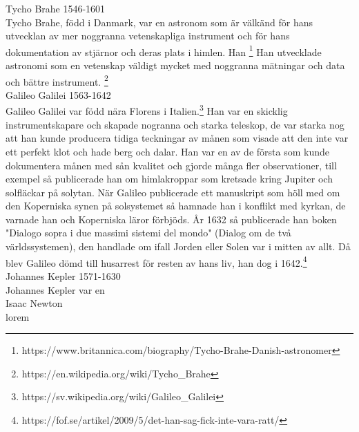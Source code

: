 \documentclass[11p]{article}
\begin{document}
    \large Tycho Brahe 1546-1601\\
    \normalsize Tycho Brahe, född i Danmark, var en astronom som är välkänd för hans utvecklan av mer noggranna
    vetenskapliga instrument och för hans dokumentation av stjärnor och deras plats i himlen. Han  \footnote{https://www.britannica.com/biography/Tycho-Brahe-Danish-astronomer}
    Han utvecklade astronomi som en vetenskap väldigt
    mycket med noggranna mätningar och data och bättre instrument. \footnote{https://en.wikipedia.org/wiki/Tycho_Brahe}
    \\


    \large Galileo Galilei 1563-1642\\
    \normalsize Galileo Galilei var född nära Florens i Italien.\footnote{https://sv.wikipedia.org/wiki/Galileo_Galilei} Han var en skicklig instrumentskapare och skapade
    nogranna och starka teleskop, de var starka nog att han kunde producera tidiga teckningar av månen som
    visade att den inte var ett perfekt klot och hade berg och dalar. Han var en av de första som kunde dokumentera
    månen med sån kvalitet och gjorde många fler observationer, till exempel så publicerade han om himlakroppar som
    kretsade kring Jupiter och solfläckar på solytan. När Galileo publicerade ett manuskript som höll med om den Koperniska
    synen på solsystemet så hamnade han i konflikt med kyrkan, de varnade han och Koperniska läror förbjöds. År 1632
    så publicerade han boken "Dialogo sopra i due massimi sistemi del mondo" (Dialog om de två världssystemen), den handlade om ifall Jorden eller Solen
    var i mitten av allt. Då blev Galileo dömd till husarrest för resten av hans liv, han dog i 1642.\footnote{https://fof.se/artikel/2009/5/det-han-sag-fick-inte-vara-ratt/}\\



    \large Johannes Kepler 1571-1630\\
    \normalsize Johannes Kepler var en  \\


    \large Isaac Newton \\
    \normalsize lorem \\


    \printbibliography
\end{document}
